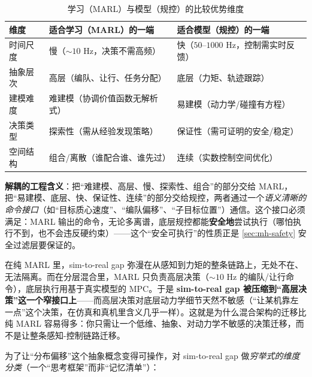 \begin{table}[H]\centering\small
\caption{学习（MARL）与模型（规控）的比较优势维度}
\label{tab:mh-decouple-dims}
\begin{tabular}{lll}
\toprule
维度 & 适合学习（MARL）的一端 & 适合模型（规控）的一端 \\
\midrule
时间尺度 & 慢（$\sim 10$ Hz，决策不需高频） & 快（$50$--$1000$ Hz，控制需实时反馈） \\
抽象层次 & 高层（编队、让行、任务分配） & 底层（力矩、轨迹跟踪） \\
建模难度 & 难建模（协调价值函数无解析式） & 易建模（动力学/碰撞有方程） \\
决策类型 & 探索性（需从经验发现策略） & 保证性（需可证明的安全/稳定） \\
空间结构 & 组合/离散（谁配合谁、谁先过） & 连续（实数控制空间优化） \\
\bottomrule
\end{tabular}
\end{table}

\noindent\textbf{解耦的工程含义}：把“难建模、高层、慢、探索性、组合”的部分交给 MARL，把“易建模、底层、快、保证性、连续”的部分交给规控，两者通过一个\emph{语义清晰的命令接口}（如“目标质心速度”、“编队偏移”、“子目标位置”）通信。这个接口必须满足：MARL 输出的命令，无论多离谱，底层规控都能\textbf{安全地}尝试执行（哪怕执行不到，也不会违反硬约束）——这个“安全可执行”的性质正是 \cref{sec:mh-safety} 安全过滤层要保证的。

\begin{insight}
在纯 MARL 里，sim-to-real gap 弥漫在从感知到力矩的整条链路上，无处不在、无法隔离。而在分层混合里，MARL 只负责高层决策（$\sim 10$ Hz 的编队/让行命令），底层执行用基于真实模型的 MPC。于是 \textbf{sim-to-real gap 被压缩到“高层决策”这一个窄接口上}——而高层决策对底层动力学细节天然不敏感（“让某机靠左一点”这个决策，在仿真和真机里含义几乎一样）。这就是为什么混合架构的迁移比纯 MARL 容易得多：你只需让一个低维、抽象、对动力学不敏感的决策迁移，而不是让整条感知-控制链路迁移。
\end{insight}

为了让“分布偏移”这个抽象概念变得可操作，对 sim-to-real gap 做\emph{穷举式的维度分类}（一个“思考框架”而非“记忆清单”）：

